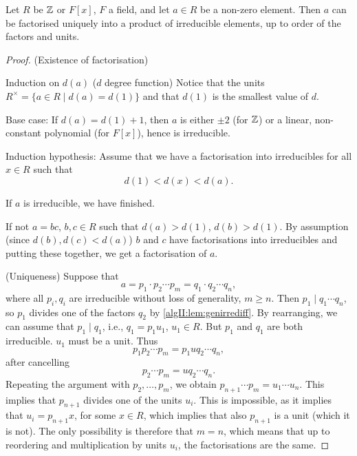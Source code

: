 \documentclass[10pt, a4paper]{article}
\begin{document}
\begin{theorem}\label{algII:thm:existfactorisation}
    Let $R$ be $\mathbb{Z}$ or $F[x]$,
    $F$ a field,
    and let $a \in R$ be a non-zero element.
    Then $a$ can be factorised uniquely into a product of irreducible elements,
    up to order of the factors and units.

    \begin{proof}
        (Existence of factorisation)

        Induction on $d(a)$
        ($d$ degree function)
        Notice that the units $R ^ {\times} = \{a \in R \mid d(a) = d(1)\}$ and that $d(1)$ is the smallest value of $d$.

        Base case:
        If $d(a) = d(1) + 1$,
        then $a$ is either $\pm 2$
        (for $\mathbb{Z}$)
        or a linear,
        non-constant polynomial
        (for $F[x]$),
        hence is irreducible.

        Induction hypothesis:
        Assume that we have a factorisation into irreducibles for all $x \in R$ such that
        \[
        d(1) < d(x) < d(a).
        \]

        If $a$ is irreducible,
        we have finished.

        If not $a = bc$,
        $b, c \in R$ such that $d(a) > d(1)$,
        $d(b) > d(1)$.
        By assumption
        (since $d(b), d(c) < d(a)$)
        $b$ and $c$ have factorisations into irreducibles and putting these together,
        we get a factorisation of $a$.

        (Uniqueness)
        Suppose that
        \[
        a = p_1\cdot p_2\cdots p_m = q_1\cdot q_2 \cdots q_n,
        \]
        where all $p_i, q_i$ are irreducible without loss of generality,
        $m \geq n$.
        Then $p_1 \mid q_1 \dotsi q_n$,
        so $p_1$ divides one of the factors $q_2$ by \autoref{algII:lem:genirrediff}.
        By rearranging,
        we can assume that $p_1 \mid q_1$,
        i.e.,
        $q_1 = p_1 u_1$,
        $u_1 \in R$.
        But $p_1$ and $q_1$ are both irreducible.
        $u_1$ must be a unit.
        Thus
        \[
        p_1p_2\cdots p_m = p_1uq_2\cdots q_n,
        \]
        after cancelling
        \[
        p_2\cdots p_m = uq_2\cdots q_n.
        \]
        Repeating the argument with $p_2, \dotsc, p_m$,
        we obtain $p_{n + 1} \dotsi p_m = u_1\dotsi u_n$.
        This implies that $p_{n + 1}$ divides one of the units $u_i$.
        This is impossible,
        as it implies that $u_i = p_{n + 1}x$,
        for some $x \in R$,
        which implies that also $p_{n + 1}$ is a unit
        (which it is not).
        The only possibility is therefore that $m = n$,
        which means that up to reordering and multiplication by units $u_i$,
        the factorisations are the same.
    \end{proof}
\end{theorem}
\end{document}
